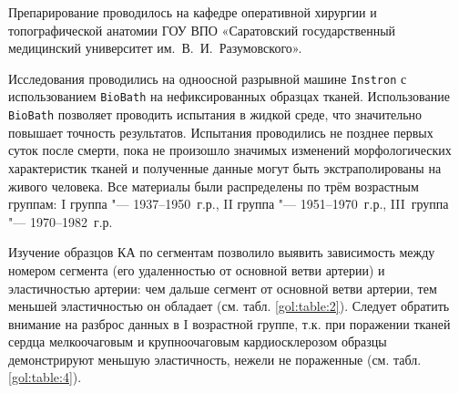 Препарирование проводилось на кафедре оперативной хирургии и топографической анатомии ГОУ ВПО «Саратовский государственный медицинский университет им.~В.~И.~Разумовского».



Исследования проводились на одноосной разрывной машине {\tt Instron} с использованием {\tt BioBath} на нефиксированных образцах тканей. Использование {\tt BioBath} позволяет проводить испытания в жидкой среде, что значительно повышает точность результатов. Испытания проводились не позднее первых суток после смерти, пока не произошло значимых изменений морфологических характеристик тканей и полученные данные могут быть экстраполированы на живого человека. Все материалы были распределены по трём возрастным группам: I группа "--- 1937--1950~г.р., I\!I группа "--- 1951--1970~г.р., I\!I\!I~группа "--- 1970--1982~г.р. 



Изучение образцов КА по сегментам позволило выявить зависимость между номером сегмента (его удаленностью от основной ветви артерии) и эластичностью артерии: чем дальше сегмент от основной ветви артерии, тем меньшей эластичностью он обладает (см. табл. \ref{gol:table:2}). Следует обратить внимание на разброс данных в I возрастной группе, т.к. при поражении тканей сердца мелкоочаговым и крупноочаговым кардиосклерозом образцы демонстрируют меньшую эластичность, нежели не пораженные (см. табл. \ref{gol:table:4}).





